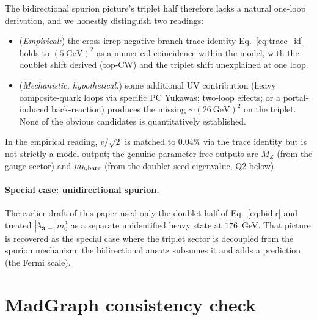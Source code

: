 \documentclass[11pt,a4paper]{article}
\newcommand{\mt}{\mathbf{3}}
\begin{document}
The bidirectional spurion picture's triplet half therefore lacks a
natural one-loop derivation, and we honestly distinguish two readings:

\begin{itemize}
\item (\emph{Empirical:}) the cross-irrep negative-branch trace
  identity Eq.~\eqref{eq:trace_id} holds to $(5~\text{GeV})^2$ as a
  numerical coincidence within the model, with the doublet shift
  derived (top-CW) and the triplet shift unexplained at one loop.
\item (\emph{Mechanistic, hypothetical:}) some additional UV
  contribution (heavy composite-quark loops via specific PC
  Yukawas; two-loop effects; or a portal-induced back-reaction)
  produces the missing $\sim\!(26~\text{GeV})^2$ on the triplet.
  None of the obvious candidates is quantitatively established.
\end{itemize}

In the empirical reading, $v/\sqrt{2}$ is matched to $0.04\%$ via the
trace identity but is not strictly a model output; the genuine
parameter-free outputs are $M_Z$ (from the gauge sector) and
$m_{h,\rm bare}$ (from the doublet seed eigenvalue, Q2 below).

\paragraph{Special case: unidirectional spurion.} The earlier draft of
this paper used only the doublet half of Eq.~\eqref{eq:bidir} and
treated $|\lambda_{\mt,-}|\,m_0^2$ as a separate unidentified heavy
state at $176$~GeV. That picture is recovered as the special case
where the triplet sector is decoupled from the spurion mechanism;
the bidirectional ansatz subsumes it and adds a prediction (the
Fermi scale).

\section{MadGraph consistency check}
\end{document}
